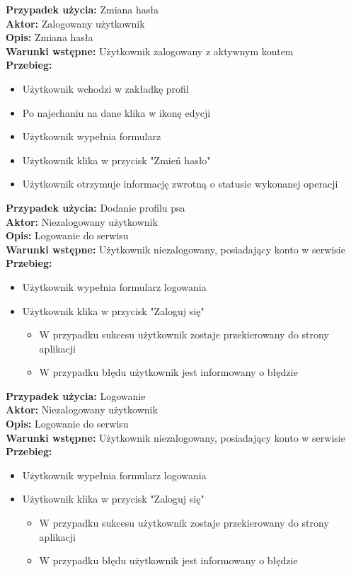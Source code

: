 \textbf{Przypadek użycia:} Zmiana hasła\\
\textbf{Aktor:} Zalogowany użytkownik\\
\textbf{Opis:} Zmiana hasła\\
\textbf{Warunki wstępne:} Użytkownik zalogowany z aktywnym kontem\\
\textbf{Przebieg:}
\begin{itemize}
    \item Użytkownik wchodzi w zakładkę profil
    \item Po najechaniu na dane klika w ikonę edycji
    \item Użytkownik wypełnia formularz
    \item Użytkownik klika w przycisk "Zmień hasło"
    \item Użytkownik otrzymuje informację zwrotną o statusie wykonanej operacji
\end{itemize}

\textbf{Przypadek użycia:} Dodanie profilu psa\\
\textbf{Aktor:} Niezalogowany użytkownik\\
\textbf{Opis:} Logowanie do serwisu\\
\textbf{Warunki wstępne:} Użytkownik niezalogowany, posiadający konto w serwisie\\
\textbf{Przebieg:}
\begin{itemize}
    \item Użytkownik wypełnia formularz logowania
    \item Użytkownik klika w przycisk "Zaloguj się"
    \begin{itemize}
        \item W przypadku sukcesu użytkownik zostaje przekierowany do strony aplikacji
        \item W przypadku błędu użytkownik jest informowany o błędzie
    \end{itemize}
\end{itemize}

\textbf{Przypadek użycia:} Logowanie\\
\textbf{Aktor:} Niezalogowany użytkownik\\
\textbf{Opis:} Logowanie do serwisu\\
\textbf{Warunki wstępne:} Użytkownik niezalogowany, posiadający konto w serwisie\\
\textbf{Przebieg:}
\begin{itemize}
    \item Użytkownik wypełnia formularz logowania
    \item Użytkownik klika w przycisk "Zaloguj się"
    \begin{itemize}
        \item W przypadku sukcesu użytkownik zostaje przekierowany do strony aplikacji
        \item W przypadku błędu użytkownik jest informowany o błędzie
    \end{itemize}
\end{itemize}

